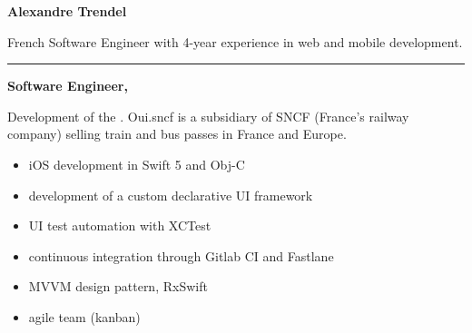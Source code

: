 \documentclass{cv}
\begin{document}
\pagestyle{empty}

\noindent\begin{minipage}[c]{\textwidth}
	\large
	\textbf{Alexandre Trendel}

	French Software Engineer with 4-year experience in web and mobile development.

	\color{solred}\rule{2cm}{1pt}

\end{minipage}

\vspace{1cm}


\noindent\begin{minipage}[t]{.65\textwidth}


\newlength{\logoboxwidth}
\setlength{\logoboxwidth}{20mm}

\begin{mainexpbox}[title=nov. 2019 -- today]

	\begin{minipage}[t]{\logoboxwidth}%
	\centering
	\end{minipage}
	\begin{minipage}[t]{0.8\textwidth}

	\textbf{Software Engineer, \evtech{}}\smallskip

	Development of the \href{https://apps.apple.com/fr/app/oui-sncf-train-et-bus/id343889987}{}.  Oui.sncf is a subsidiary of SNCF (France's railway company) selling train and bus passes in France and Europe.

	\begin{itemize}
		\item iOS development in Swift 5 and Obj-C
		\item development of a custom declarative UI framework
		\item UI test automation with XCTest
		\item continuous integration through Gitlab CI and Fastlane
		\item MVVM design pattern, RxSwift
		\item agile team (kanban)
	\end{itemize}
	\end{minipage}

\end{mainexpbox}

\begin{expbox}[title={dec. 2016, \faicon{clock-o} 3 years}]


\end{expbox}
\end{minipage}
\end{document}
